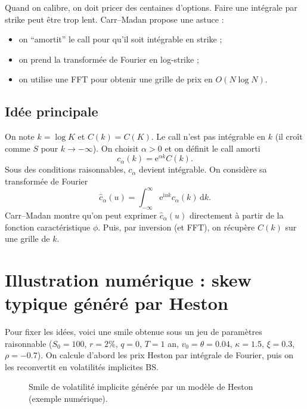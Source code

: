 \documentclass[11pt,a4paper]{report}
\newcommand{\dd}{\mathrm{d}}
\newcommand{\ee}{\mathrm{e}}
\newcommand{\ii}{\mathrm{i}}
\newcommand{\1}{\mathbbm{1}}
\theoremstyle{definition}
\theoremstyle{plain}
\theoremstyle{remark}
\begin{document}
Quand on calibre, on doit pricer des centaines d'options.
Faire une intégrale par strike peut être trop lent.
Carr--Madan propose une astuce :
\begin{itemize}
\item on ``amortit'' le call pour qu'il soit intégrable en strike ;
\item on prend la transformée de Fourier en log-strike ;
\item on utilise une FFT pour obtenir une grille de prix en $O(N\log N)$.
\end{itemize}

\subsection{Idée principale}
On note $k=\log K$ et $C(k)=C(K)$.
Le call n'est pas intégrable en $k$ (il croît comme $S$ pour $k\to -\infty$).
On choisit $\alpha>0$ et on définit le call amorti
\[
c_\alpha(k)=\ee^{\alpha k}C(k).
\]
Sous des conditions raisonnables, $c_\alpha$ devient intégrable.
On considère sa transformée de Fourier
\[
\hat{c}_\alpha(u)=\int_{-\infty}^{\infty} \ee^{\ii u k}c_\alpha(k)\,\dd k.
\]
Carr--Madan montre qu'on peut exprimer $\hat{c}_\alpha(u)$ directement à partir de la fonction caractéristique $\phi$.
Puis, par inversion (et FFT), on récupère $C(k)$ sur une grille de $k$.

\section{Illustration numérique : skew typique généré par Heston}
Pour fixer les idées, voici une smile obtenue sous un jeu de paramètres raisonnable
($S_0=100$, $r=2\%$, $q=0$, $T=1$ an,
$v_0=\theta=0.04$,
$\kappa=1.5$, $\xi=0.3$, $\rho=-0.7$).
On calcule d'abord les prix Heston par intégrale de Fourier, puis on les reconvertit en volatilités implicites BS.

\begin{figure}[h!]
\centering
{}
\caption{Smile de volatilité implicite générée par un modèle de Heston (exemple numérique).}
\label{fig:heston_smile_example}
\end{figure}
\end{document}
